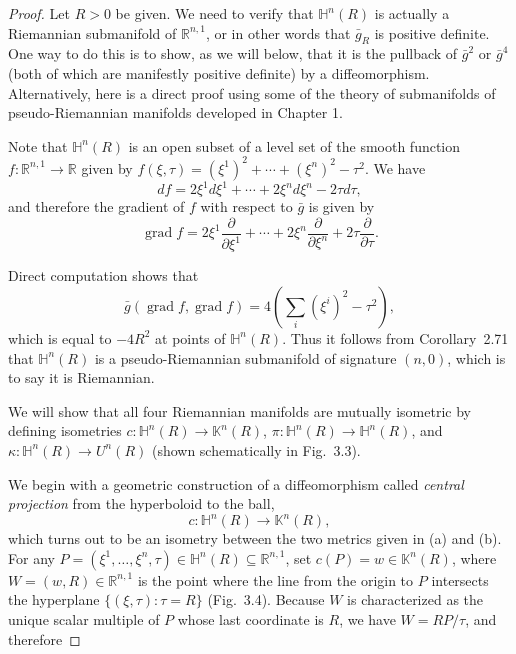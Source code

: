 \begin{proof}
Let $R > 0$ be given. We need to verify that $\mathbb{H}^n(R)$ is actually a Riemannian submanifold of $\mathbb{R}^{n,1}$, or in other words that $\bar{g}_R$ is positive definite. One way to do this is to show, as we will below, that it is the pullback of $\bar{g}^2$ or $\bar{g}^4$ (both of which are manifestly positive definite) by a diffeomorphism. Alternatively, here is a direct proof using some of the theory of submanifolds of pseudo-Riemannian manifolds developed in Chapter 1.


Note that $\mathbb{H}^n(R)$ is an open subset of a level set of the smooth function $f: \mathbb{R}^{n,1} \to \mathbb{R}$ given by $f(\xi, \tau) = (\xi^1)^2 + \cdots + (\xi^n)^2 - \tau^2$. We have
\[
df = 2\xi^1 d\xi^1 + \cdots + 2\xi^n d\xi^n - 2\tau d\tau,
\]
and therefore the gradient of $f$ with respect to $\bar{g}$ is given by
\begin{equation}
\operatorname{grad} f = 2\xi^1 \frac{\partial}{\partial \xi^1} + \cdots + 2\xi^n \frac{\partial}{\partial \xi^n} + 2\tau \frac{\partial}{\partial \tau}. \tag{3.10}
\end{equation}

Direct computation shows that
\[
\bar{g}(\operatorname{grad} f, \operatorname{grad} f) = 4\left(\sum_i (\xi^i)^2 - \tau^2\right),
\]
which is equal to $-4R^2$ at points of $\mathbb{H}^n(R)$. Thus it follows from Corollary~2.71 that $\mathbb{H}^n(R)$ is a pseudo-Riemannian submanifold of signature $(n,0)$, which is to say it is Riemannian.

We will show that all four Riemannian manifolds are mutually isometric by defining isometries $c: \mathbb{H}^n(R) \to \mathbb{K}^n(R)$, $\pi: \mathbb{H}^n(R) \to \mathbb{H}^n(R)$, and $\kappa: \mathbb{H}^n(R) \to U^n(R)$ (shown schematically in Fig.~3.3).

We begin with a geometric construction of a diffeomorphism called \emph{central projection} from the hyperboloid to the ball,
\[
c: \mathbb{H}^n(R) \to \mathbb{K}^n(R),
\]
which turns out to be an isometry between the two metrics given in (a) and (b). For any $P = (\xi^1, \ldots, \xi^n, \tau) \in \mathbb{H}^n(R) \subseteq \mathbb{R}^{n,1}$, set $c(P) = w \in \mathbb{K}^n(R)$, where $W = (w, R) \in \mathbb{R}^{n,1}$ is the point where the line from the origin to $P$ intersects the hyperplane $\{(\xi, \tau): \tau = R\}$ (Fig.~3.4). Because $W$ is characterized as the unique scalar multiple of $P$ whose last coordinate is $R$, we have $W = RP/\tau$, and therefore


\end{proof}
